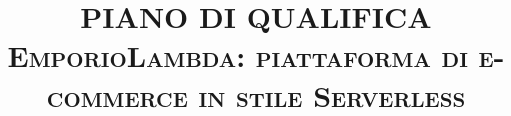 


\newcommand{\pathToTemplate}{../../Template/Documento}

\newcommand{\docNome}{ PIANO DI QUALIFICA }
\newcommand{\docVersione}{2.0.0}
\newcommand{\docNomeProgetto}{ EmporioLambda: piattaforma di e-commerce in stile Serverless }
\newcommand{\docStatus}{approvato}
\newcommand{\docUso}{esterno}
\newcommand{\docDescrizione}{
    \begin{center}
    Documento di definizione delle strategie di verifica e validazione
    \end{center}
}


\newcommand{\docRedattori}{
	Marco Canovese \\&
    Michele Veronesi \\&
    Gianmarco Guazzo
    
}
\newcommand{\docVerificatori}{
	Stefano Lazzaroni \\&
    Francesco Trolese
}
\newcommand{\docApprovazione}{
    Ivan Furlan
}

\newcommand{\nomeCorso}{
    Ingegneria del Software - Università degli Studi di Padova
}



\documentclass[11pt,a4paper,table]{article}

    


\title{ \hr \huge \textsc{\docNome} \\ 
        \vspace{11pt} \large \textsc{\docNomeProgetto} \hr}

\author{} %
\date{} %


 





\newpage
{}
\addtocounter{table}{-1}


\tableofcontents
\listoffigures
\listoftables


\newpage







